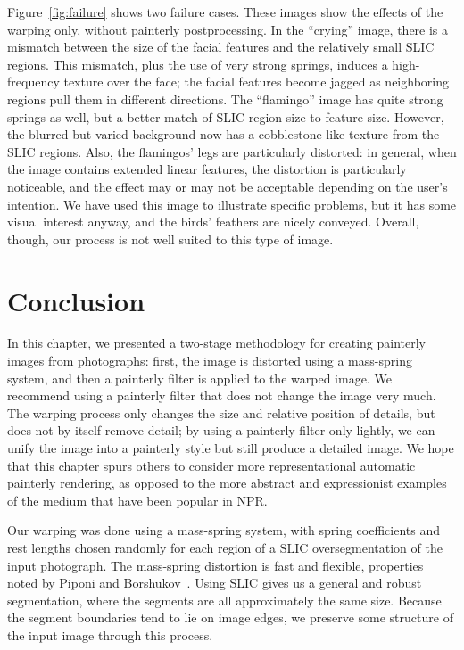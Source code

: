 Figure~\ref{fig:failure} shows two failure cases. These images show the effects of the warping only,
without painterly postprocessing.  In the ``crying'' image, there is a mismatch between
the size of the facial features and the relatively small SLIC regions. This mismatch, plus the
use of very strong springs, induces a high-frequency texture over
the face; the facial features become jagged as neighboring regions pull them in different directions.
The ``flamingo'' image has quite strong springs as well, but a better match of SLIC region size
to feature size. However, the blurred but varied background now has a cobblestone-like texture
from the SLIC regions. Also, the flamingos' legs are particularly distorted: in general, when the image contains extended linear features, the distortion is particularly noticeable, and the effect may or may not be acceptable depending on the user's
intention. We have used this image to illustrate
specific problems, but it has some visual interest anyway, and the birds' feathers are nicely conveyed. Overall, though, our process is not well suited to this type of image.

%
%
\section{Conclusion} \label{conclusionIW}

In this chapter, we presented a two-stage methodology for creating painterly
images from photographs: first, the image is distorted using a mass-spring
system, and then a painterly filter is applied to the warped image. We recommend
using a painterly filter that does not change the image very much. The warping
process only changes the size and relative position of details, but does not by
itself remove detail; by using a painterly filter only lightly, we can unify the
image into a painterly style but still produce a detailed image. We hope that
this chapter spurs others to consider more representational automatic painterly
rendering, as opposed to the more abstract and expressionist examples of the
medium that have been popular in NPR.

Our warping was done using a mass-spring system, with spring coefficients and
rest lengths chosen randomly for each region of a SLIC oversegmentation of the
input photograph. The mass-spring distortion is fast and flexible, properties
noted by Piponi and Borshukov~\cite{pelting}. Using SLIC gives us a general and
robust segmentation, where the segments are all approximately the same size.
Because the segment boundaries tend to lie on image edges, we preserve some
structure of the input image through this process.

